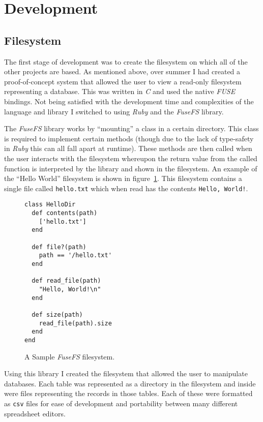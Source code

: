 
\section{Development}

\subsection{Filesystem}

The first stage of development was to create the filesystem on which all of the
other projects are based. As mentioned above, over summer I had created
a proof-of-concept system that allowed the user to view a read-only filesystem
representing a database. This was written in \emph{C} and used the native
\emph{FUSE} bindings. Not being satisfied with the development time and
complexities of the language and library I switched to using \emph{Ruby} and
the \emph{FuseFS} library.

The \emph{FuseFS} library works by ``mounting'' a class in a certain directory.
This class is required to implement certain methods (though due to the lack of
type-safety in \emph{Ruby} this can all fall apart at runtime). These methods
are then called when the user interacts with the filesystem whereupon the
return value from the called function is interpreted by the library and shown
in the filesystem. An example of the ``Hello World'' filesystem is shown in
figure~\ref{fig:fusefs}. This filesystem contains a single file called
\texttt{hello.txt} which when read has the contents \texttt{Hello, World!}.

\begin{figure}
\begin{verbatim}
class HelloDir
  def contents(path)
    ['hello.txt']
  end

  def file?(path)
    path == '/hello.txt'
  end

  def read_file(path)
    "Hello, World!\n"
  end

  def size(path)
    read_file(path).size
  end
end
\end{verbatim}
  \caption{A Sample \emph{FuseFS} filesystem.}
  \label{fig:fusefs}
\end{figure}

Using this library I created the filesystem that allowed the user to manipulate
databases. Each table was represented as a directory in the filesystem and
inside were files representing the records in those tables. Each of these were
formatted as \texttt{csv} files for ease of development and portability between
many different spreadsheet editors.

